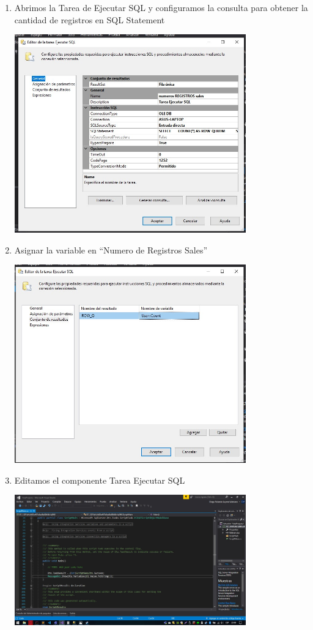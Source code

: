 \begin{enumerate}
    \item Abrimos la Tarea de Ejecutar SQL y configuramos la consulta para obtener la cantidad de registros en SQL Statement
     \begin{center}
            \includegraphics[width=10cm]{imagenes/registros_flujo_configuracion.jpg}
        \end{center}
        
        
                
    \item Asignar la variable en “Numero de Registros Sales”
     \begin{center}
            \includegraphics[width=10cm]{imagenes/registros_result_set.jpg}
        \end{center}
        
    \item Editamos el componente Tarea Ejecutar SQL
     \begin{center}
            \includegraphics[width=10cm]{imagenes/registros_proyecto_print.jpg}
        \end{center}
        

\end{enumerate}
